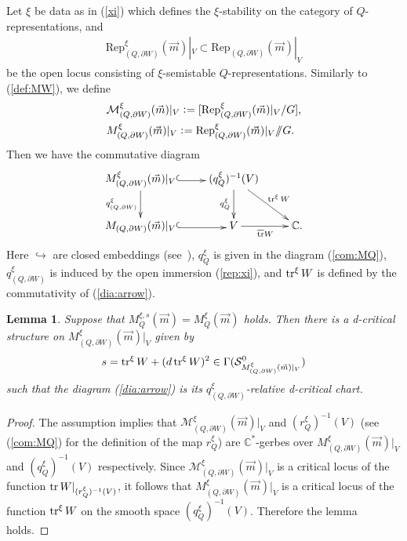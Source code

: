 \documentclass[11pt]{amsart}
\theoremstyle{plain}
\newtheorem{lem}[thm]{Lemma}
\theoremstyle{definition}
\theoremstyle{remark}
\newcommand{\sslash}{/\!\!/}
\newcommand{\mM}{\mathcal{M}}
\newcommand{\sS}{\mathcal{S}}
\newcommand{\tr}{\mathop{\rm tr}\nolimits}
\begin{document}
Let $\xi$ be data as in (\ref{xi}) which defines the 
$\xi$-stability on the category of $Q$-representations, and 
\begin{align}\label{rep:xi}
\mathrm{Rep}_{(Q, \partial W)}^{\xi}(\vec{m})|_{V}
\subset \mathrm{Rep}_{(Q, \partial W)}(\vec{m})|_{V}
\end{align}
be the open locus consisting of $\xi$-semistable 
$Q$-representations. Similarly to (\ref{def:MW}), we define
\begin{align*}
&\mM_{(Q, \partial W)}^{\xi}(\vec{m})|_{V}
\cneq [\mathrm{Rep}_{(Q, \partial W)}^{\xi}(\vec{m})|_{V}/G], \\ 
&M_{(Q, \partial W)}^{\xi}(\vec{m})|_{V}
\cneq \mathrm{Rep}_{(Q, \partial W)}^{\xi}(\vec{m})|_{V}\sslash G. 
\end{align*}
Then we have the commutative diagram
\begin{align}\label{dia:arrow}
\xymatrix{
M_{(Q, \partial W)}^{\xi}(\vec{m})|_{V} \ar[d]_-{q_{(Q, \partial W)}^{\xi}} 
\ar@<-0.3ex>@{^{(}->}[r] & (q_{Q}^{\xi})^{-1}(V) \ar[d]_-{q_{Q}^{\xi}}
 \ar[rd]^-{\tr^{\xi} W}
&  \\
M_{(Q, \partial W)}(\vec{m})|_{V}  
\ar@<-0.3ex>@{^{(}->}[r] & V \ar[r]_{\overline{\tr} W} & \mathbb{C}.
}
\end{align}
Here $\hookrightarrow$ are closed embeddings (see~\cite[Lemma~2.9]{Todstack}), 
$q_{Q}^{\xi}$ is given in the diagram (\ref{com:MQ}), 
$q_{(Q, \partial W)}^{\xi}$ is induced by the 
open immersion 
(\ref{rep:xi}), and
$\tr^{\xi}W$ is defined by the commutativity 
of (\ref{dia:arrow}). 

\begin{lem}\label{MW:dcrit}
Suppose that $M_{Q}^{\xi, s}(\vec{m})=M_Q^{\xi}(\vec{m})$
holds. 
Then there is a d-critical structure on 
$M_{(Q, \partial W)}^{\xi}(\vec{m})|_{V}$
given by 
\begin{align*}
s=\tr^{\xi}W+(d \tr^{\xi}W)^2 
\in \Gamma(\sS_{M_{(Q, \partial W)}^{\xi}(\vec{m})|_{V}}^0)
\end{align*}
such that the diagram (\ref{dia:arrow})
is its $q_{(Q, \partial W)}^{\xi}$-relative 
d-critical chart.
\end{lem}
\begin{proof}
The
assumption implies that 
$\mM_{(Q, \partial W)}^{\xi}(\vec{m})|_{V}$
and
$(r_{Q}^{\xi})^{-1}(V)$
(see (\ref{com:MQ}) for the definition of the 
map $r_Q^{\xi}$)
are $\mathbb{C}^{\ast}$-gerbes
over $M_{(Q, \partial W)}^{\xi}(\vec{m})|_{V}$
and
$(q_{Q}^{\xi})^{-1}(V)$
respectively. 
Since $\mM_{(Q, \partial W)}^{\xi}(\vec{m})|_{V}$
is a critical locus of the function 
$\tr W|_{(r_{Q}^{\xi})^{-1}(V)}$, 
it follows that 
$M_{(Q, \partial W)}^{\xi}(\vec{m})|_{V}$
is a critical locus of the function 
$\tr^{\xi}W$
on the smooth space 
$(q_Q^{\xi})^{-1}(V)$. 
Therefore the lemma holds. 
\end{proof}
\end{document}
